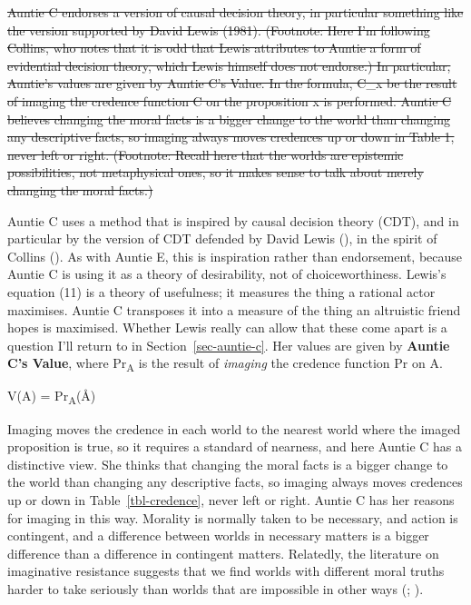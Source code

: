 \documentclass[
  11pt,
  letterpaper,
  DIV=11,
  numbers=noendperiod,
  twoside]{scrartcl}
\providecommand{\tightlist}{%
  \setlength{\itemsep}{0pt}\setlength{\parskip}{0pt}}
\begin{document}
\sout{Auntie C endorses a version of causal decision theory, in
particular something like the version supported by David Lewis (1981).
(Footnote: Here I'm following Collins, who notes that it is odd that
Lewis attributes to Auntie a form of evidential decision theory, which
Lewis himself does not endorse.) In particular, Auntie's values are
given by Auntie C's Value. In the formula, C\_x be the result of imaging
the credence function C on the proposition x is performed. Auntie C
believes changing the moral facts is a bigger change to the world than
changing any descriptive facts, so imaging always moves credences up or
down in Table 1, never left or right. (Footnote: Recall here that the
worlds are epistemic possibilities, not metaphysical ones, so it makes
sense to talk about merely changing the moral facts.)}

\begingroup\bfseries\boldmath

Auntie C uses a method that is inspired by causal decision theory (CDT),
and in particular by the version of CDT defended by David Lewis
(), in the spirit of Collins
(). As with Auntie E, this is
inspiration rather than endorsement, because Auntie C is using it as a
theory of desirability, not of choiceworthiness. Lewis's equation (11)
is a theory of usefulness; it measures the thing a rational actor
maximises. Auntie C transposes it into a measure of the thing an
altruistic friend hopes is maximised. Whether Lewis really can allow
that these come apart is a question I'll return to in
Section~\ref{sec-auntie-c}. Her values are given by \textbf{Auntie C's
Value}, where Pr\textsubscript{A} is the result of \emph{imaging} the
credence function Pr on A.

\endgroup

\begin{description}
\tightlist
\item[Auntie C's Value]
V(A) = Pr\textsubscript{A}(Å)
\end{description}

\begingroup\bfseries\boldmath

Imaging moves the credence in each world to the nearest world where the
imaged proposition is true, so it requires a standard of nearness, and
here Auntie C has a distinctive view. She thinks that changing the moral
facts is a bigger change to the world than changing any descriptive
facts, so imaging always moves credences up or down in
Table~\ref{tbl-credence}, never left or right. Auntie C has her reasons
for imaging in this way. Morality is normally taken to be necessary, and
action is contingent, and a difference between worlds in necessary
matters is a bigger difference than a difference in contingent matters.
Relatedly, the literature on imaginative resistance suggests that we
find worlds with different moral truths harder to take seriously than
worlds that are impossible in other ways
(;
).
\end{document}
